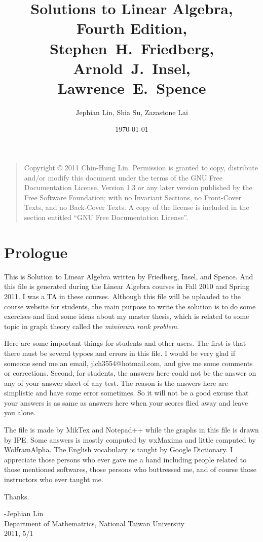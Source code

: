 \documentclass{report}
\title{Solutions to Linear Algebra, Fourth Edition,\\ Stephen~H.~Friedberg, Arnold~J.~Insel, Lawrence~E.~Spence}
\author{Jephian Lin, Shia Su, Zazastone Lai}
\date{\today}
\theoremstyle{definition}
\begin{document}
\maketitle
\begin{quote}
    Copyright \copyright{}  2011  Chin-Hung Lin.
    Permission is granted to copy, distribute and/or modify this document
    under the terms of the GNU Free Documentation License, Version 1.3
    or any later version published by the Free Software Foundation;
    with no Invariant Sections, no Front-Cover Texts, and no Back-Cover Texts.
    A copy of the license is included in the section entitled ``GNU
    Free Documentation License''.
\end{quote}
\chapter*{Prologue}
This is Solution to Linear Algebra written by Friedberg, Insel, and Spence. And this file is generated during the Linear Algebra courses in Fall 2010 and Spring 2011. I was a TA in these courses. Although this file will be uploaded to the course website for students, the main purpose to write the solution is to do some exercises and find some ideas about my master thesis, which is related to some topic in graph theory called the \textit{minimum rank problem}. 

Here are some important things for students and other users. The first is that there must be several typoes and errors in this file. I would be very glad if someone send me an email, jlch3554@hotmail.com, and give me some comments or corrections. Second, for students, the answers here could not be the answer on any of your answer sheet of any test. The reason is the answers here are simplistic and have some error sometimes. So it will not be a good excuse that your answers is as same as answers here when your scores flied away and leave you alone.

The file is made by MikTex and Notepad++ while the graphs in this file is drawn by IPE. Some answers is mostly computed by wxMaxima and little computed by WolframAlpha. The English vocabulary is taught by Google Dictionary. I appreciate those persons who ever gave me a hand including people related to those mentioned softwares, those persons who buttressed me, and of course those instructors who ever taught me. 

Thanks.

\begin{flushright}
-Jephian Lin\\
Department of Mathematrics, National Taiwan University\\
2011, 5/1
\end{flushright}
\end{document}
